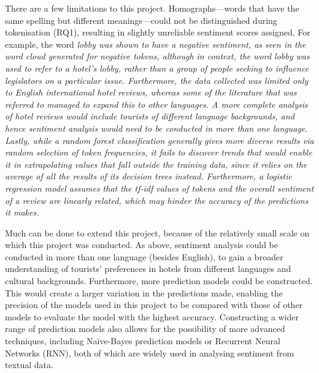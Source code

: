 \documentclass[12pt,bibliography=totocnumbered]{scrartcl}
\begin{document}
There are a few limitations to this project. Homographs---words that have the same spelling
but different meanings---could not be distinguished during tokenisation (RQ1), resulting in
slightly unreliable sentiment scores assigned. For example, the word \it{lobby} was shown to
have a negative sentiment, as seen in the word cloud generated for negative tokens, although
in context, the word \it{lobby} was used to refer to a hotel's lobby, rather than a group of
people seeking to influence legislators on a particular issue. Furthermore, the data collected
was limited only to English international hotel reviews, whereas some of the literature that was
referred to managed to expand this to other languages. A more complete analysis of hotel reviews
would include tourists of different language backgrounds, and hence sentiment analysis would need
to be conducted in more than one language. Lastly, while a random forest classification generally
gives more diverse results via random selection of token frequencies, it fails to discover trends
that would enable it in extrapolating values that fall outside the training data,
since it relies on the average of all the results of its decision trees instead. Furthermore,
a logistic regression model assumes that the \it{tf-idf} values of tokens and the overall sentiment
of a review are linearly related, which may hinder the accuracy of the predictions it makes.

Much can be done to extend this project, because of the relatively small scale on which this project
was conducted. As above, sentiment analysis could be conducted in more than one language (besides English),
to gain a broader understanding of tourists' preferences in hotels from different languages and cultural
backgrounds. Furthermore, more prediction models could be constructed. This would create a larger
variation in the predictions made, enabling the precision of the models used in this project to be
compared with those of other models to evaluate the model with the highest accuracy. Constructing a
wider range of prediction models also allows for the possibility of more advanced techniques,
including Naïve-Bayes prediction models or Recurrent Neural Networks (RNN), both of which are
widely used in analysing sentiment from textual data.

\printbibliography
\end{document}
